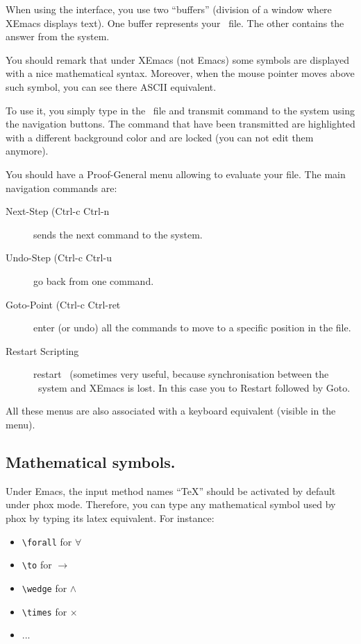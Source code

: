 When using the interface, you use two ``buffers'' (division of a
window where XEmacs displays text). One buffer represents your \AFD\
file. The other contains the answer from the system.

You should remark that under XEmacs (not Emacs) some symbols are
displayed with a nice mathematical syntax. Moreover, when the mouse
pointer moves above such symbol, you can see there ASCII equivalent.

To use it, you simply type in the \AFD\ file and transmit command to
the system using the navigation buttons. The command that have been
transmitted are highlighted with a different background color and are
locked (you can not edit them anymore).

You should have a Proof-General menu allowing to evaluate your file.
The main navigation commands are:

\begin{description}
\item[Next-Step (Ctrl-c Ctrl-n] sends the next command to the system.
\item[Undo-Step (Ctrl-c Ctrl-u] go back from one command.
\item[Goto-Point (Ctrl-c Ctrl-ret] enter (or undo) all the commands to move to a specific
position in the file.
\item[Restart Scripting] restart \AFD\ (sometimes very useful, because
synchronisation between the \AFD\ system and XEmacs is lost. In this
case you to Restart followed by Goto.
\end{description}

All these menus are also associated with a keyboard
equivalent (visible in the menu).

\subsection{Mathematical symbols.}

Under Emacs, the input method names ``TeX'' should be activated by
default under phox mode. Therefore, you can type any mathematical symbol used
by phox by typing its latex equivalent. For instance:

\begin{itemize}
  \item \verb#\forall# for $\forall$
  \item \verb#\to# for $\to$
  \item \verb#\wedge# for $\wedge$
  \item \verb#\times# for $\times$
  \item ...
\end{itemize}

